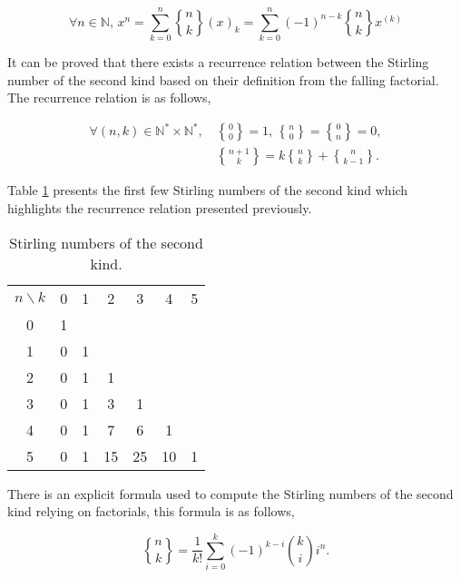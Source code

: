 \begin{equation} \label{eqnA.5}
\forall n \in \mathbb{N} ,\, x^{n} = \sum_{k=0}^{n} \genfrac{\{}{\}}{0pt}{0}{n}{k} (x)_{k} = \sum_{k=0}^{n} (-1)^{n-k}\genfrac{\{}{\}}{0pt}{0}{n}{k} x^{(k)}
\end{equation}

It can be proved that there exists a recurrence relation between the Stirling number of the second kind based on their definition from the falling factorial. The recurrence relation is as follows,

\begin{subequations} \label{eqnA.6}
\begin{align}
\forall (n,k) \in \mathbb{N}^{*} \times \mathbb{N}^{*} ,\, & \genfrac{\{}{\}}{0pt}{0}{0}{0} = 1 ,\, \genfrac{\{}{\}}{0pt}{0}{n}{0} = \genfrac{\{}{\}}{0pt}{0}{0}{n} = 0, \label{eqnA.6a} \\
& \genfrac{\{}{\}}{0pt}{0}{n+1}{k} = k \genfrac{\{}{\}}{0pt}{0}{n}{k} + \genfrac{\{}{\}}{0pt}{0}{n}{k-1}. \label{eqnA.6b}
\end{align}
\end{subequations}

Table \ref{tabA.2} presents the first few Stirling numbers of the second kind which highlights the recurrence relation presented previously.

\begin{table}[!htbp]
\centering
\caption{Stirling numbers of the second kind.}
\label{tabA.2}
\begin{tabular}{ccccccc}
\toprule
$n \backslash k$ & 0 & 1 & 2 & 3 & 4 & 5 \\
\cmidrule(lr){1-7}
0 & 1 & & & & & \\
1 & 0 & 1 & & & & \\
2 & 0 & 1 & 1 & & & \\
3 & 0 & 1 & 3 & 1 & & \\
4 & 0 & 1 & 7 & 6 & 1 & \\
5 & 0 & 1 & 15 & 25 & 10 & 1 \\
\bottomrule
\end{tabular}
\end{table}

There is an explicit formula used to compute the Stirling numbers of the second kind relying on factorials, this formula is as follows,

\begin{equation} \label{eqnA.7}
\genfrac{\{}{\}}{0pt}{0}{n}{k} = \frac{1}{k!} \sum_{i=0}^{k} (-1)^{k-i} \genfrac{(}{)}{0pt}{0}{k}{i} i^{n}.
\end{equation}

